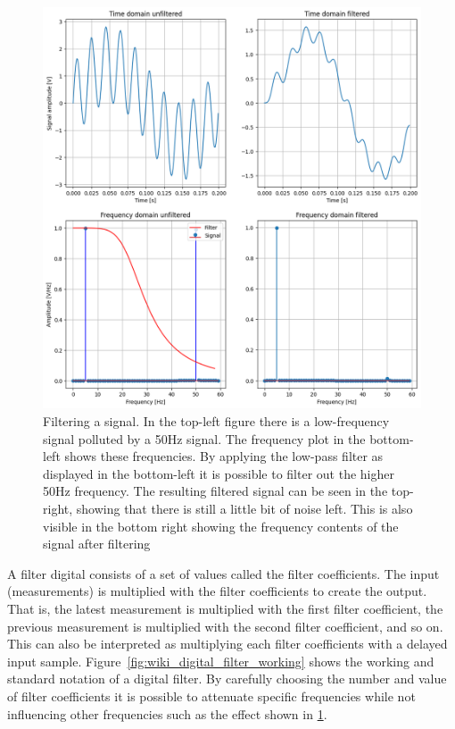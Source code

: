 \begin{figure}[h!t]
	\begin{center}
		\includegraphics[width=1.0\columnwidth]{images/filter_example.png}
	\end{center}
	\caption{Filtering a signal. In the top-left figure there is a low-frequency signal polluted by a 50Hz signal. The frequency plot in the bottom-left shows these frequencies. By applying the low-pass filter as displayed in the bottom-left it is possible to filter out the higher 50Hz frequency. The resulting filtered signal can be seen in the top-right, showing that there is still a little bit of noise left. This is also visible in the bottom right showing the frequency contents of the signal after filtering}
	\label{fig:filter_example}
\end{figure}

A filter digital consists of a set of values called the filter coefficients. The input (measurements) is multiplied with the filter coefficients to create the output. That is, the latest measurement is multiplied with the first filter coefficient, the previous measurement is multiplied with the second filter coefficient, and so on. This can also be interpreted as multiplying each filter coefficients with a delayed input sample. Figure~\ref{fig:wiki_digital_filter_working} shows the working and standard notation of a digital filter.
By carefully choosing the number and value of filter coefficients it is possible to attenuate specific frequencies while not influencing other frequencies such as the effect shown in \ref{fig:filter_example}.

